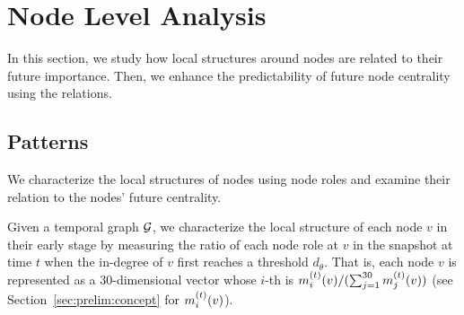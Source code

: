 

\section{Node Level Analysis} \label{section:node}
In this section, we study how local structures around nodes are related to their future importance.
Then, we enhance the predictability of future node centrality using the relations.


\subsection{Patterns}
We characterize the local structures of nodes using node roles and examine their relation to the nodes' future centrality.

\begin{table}[t]
\vspace{-3mm}
\caption{\label{tab:signal_degree}
The absolute value of the Spearman's rank correlation coefficients between node role ratios and future centralities (averaged over all node roles and all datasets for each centrality measure) and each value of the threshold $d_\theta$.
As the number of node neighbors increases (i.e., $d_\theta$ increases), the local-structural signals about future centralities become stronger (i.e., the absolute values increase).
}
\end{table}

Given a temporal graph $\mathcal{G}$, we characterize the local structure of each node $v$ in their early stage by measuring the ratio of each node role at $v$ in the snapshot at time $t$ when the in-degree of $v$ first reaches a threshold $d_\theta$.
That is, each node $v$ is represented as a $30$-dimensional vector whose $i$-th is $m^{(t)}_i(v)/(\sum_{j=1}^{30}m^{(t)}_j(v))$  (see Section~\ref{sec:prelim:concept} for $m^{(t)}_i(v)$).

